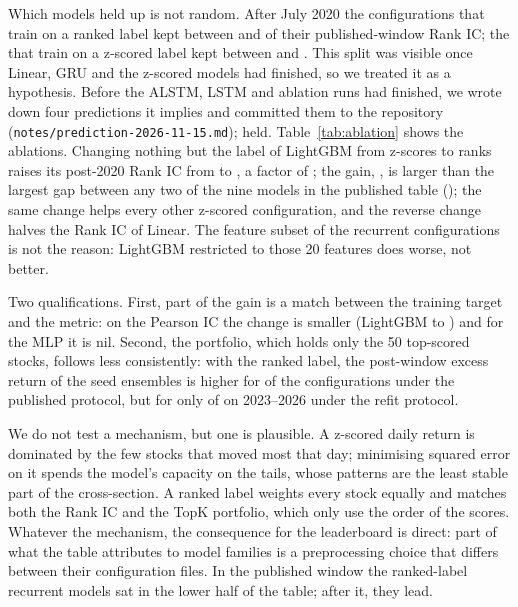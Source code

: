 \documentclass[11pt]{article}
\begin{document}
Which models held up is not random.
After July 2020 the \NRankModels{} configurations that train on a ranked label kept between \KeptRankMin{} and \KeptRankMax{} of their published-window Rank IC; the \NZModels{} that train on a z-scored label kept between \KeptZMin{} and \KeptZMax{}.
This split was visible once Linear, GRU and the z-scored models had finished, so we treated it as a hypothesis.
Before the ALSTM, LSTM and ablation runs had finished, we wrote down four predictions it implies and committed them to the repository (\texttt{notes/prediction-2026-11-15.md}); \PredHeld{} held.
Table~\ref{tab:ablation} shows the ablations.
Changing nothing but the label of LightGBM from z-scores to ranks raises its post-2020 Rank IC from \AblBaseLGBRankPost{} to \AblLGBRankPost{}, a factor of \AblLGBRankRatio{}; the gain, \AblLGBRankGain{}, is larger than the largest gap between any two of the nine models in the published table (\PubTableGap{}); the same change helps every other z-scored configuration, and the reverse change halves the Rank IC of Linear.
The feature subset of the recurrent configurations is not the reason: LightGBM restricted to those 20 features does worse, not better.

Two qualifications.
First, part of the gain is a match between the training target and the metric: on the Pearson IC the change is smaller (LightGBM \AblBaseLGBRankPostIC{} to \AblLGBRankPostIC{}) and for the MLP it is nil.
Second, the portfolio, which holds only the 50 top-scored stocks, follows less consistently: with the ranked label, the post-window excess return of the seed ensembles is higher for \RankBetterRetPost{} of the \RankBetterRetOf{} configurations under the published protocol, but for only \RankBetterRetRecent{} of \RankBetterRetOf{} on 2023--2026 under the refit protocol.

We do not test a mechanism, but one is plausible.
A z-scored daily return is dominated by the few stocks that moved most that day; minimising squared error on it spends the model's capacity on the tails, whose patterns are the least stable part of the cross-section.
A ranked label weights every stock equally and matches both the Rank IC and the TopK portfolio, which only use the order of the scores.
Whatever the mechanism, the consequence for the leaderboard is direct: part of what the table attributes to model families is a preprocessing choice that differs between their configuration files.
In the published window the ranked-label recurrent models sat in the lower half of the table; after it, they lead.
\end{document}
